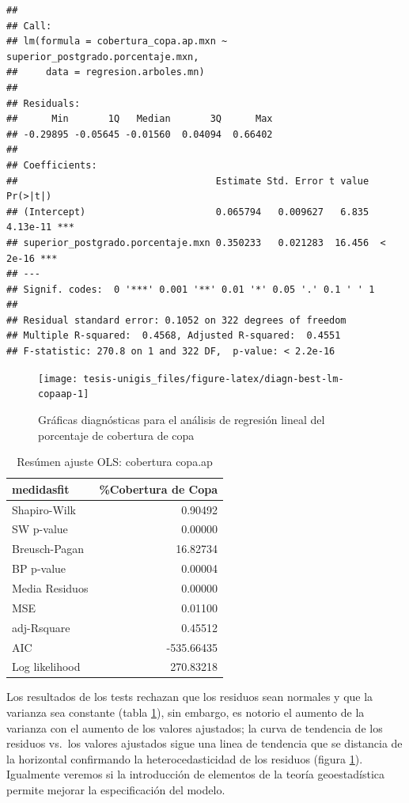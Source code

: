 \documentclass[12pt,]{book}
\begin{document}
\begin{verbatim}
## 
## Call:
## lm(formula = cobertura_copa.ap.mxn ~ superior_postgrado.porcentaje.mxn, 
##     data = regresion.arboles.mn)
## 
## Residuals:
##      Min       1Q   Median       3Q      Max 
## -0.29895 -0.05645 -0.01560  0.04094  0.66402 
## 
## Coefficients:
##                                   Estimate Std. Error t value Pr(>|t|)    
## (Intercept)                       0.065794   0.009627   6.835 4.13e-11 ***
## superior_postgrado.porcentaje.mxn 0.350233   0.021283  16.456  < 2e-16 ***
## ---
## Signif. codes:  0 '***' 0.001 '**' 0.01 '*' 0.05 '.' 0.1 ' ' 1
## 
## Residual standard error: 0.1052 on 322 degrees of freedom
## Multiple R-squared:  0.4568, Adjusted R-squared:  0.4551 
## F-statistic: 270.8 on 1 and 322 DF,  p-value: < 2.2e-16
\end{verbatim}

\begin{figure}
\texttt{[image: tesis-unigis\_files/figure-latex/diagn-best-lm-copaap-1]} \caption{Gráficas diagnósticas para el análisis de regresión lineal del porcentaje de cobertura de copa}\label{fig:diagn-best-lm-copaap}
\end{figure}

\begin{table}

\caption{\label{tab:fitlm-copaap-best}Resúmen ajuste OLS: cobertura copa.ap}
\centering
\begin{tabular}[t]{l|r}
\hline
medidasfit & \%Cobertura de Copa\\
\hline
Shapiro-Wilk & 0.90492\\
\hline
SW p-value & 0.00000\\
\hline
Breusch-Pagan & 16.82734\\
\hline
BP p-value & 0.00004\\
\hline
Media Residuos & 0.00000\\
\hline
MSE & 0.01100\\
\hline
adj-Rsquare & 0.45512\\
\hline
AIC & -535.66435\\
\hline
Log likelihood & 270.83218\\
\hline
\end{tabular}
\end{table}

Los resultados de los tests rechazan que los residuos sean normales y
que la varianza sea constante (tabla \ref{tab:fitlm-copaap-best}), sin
embargo, es notorio el aumento de la varianza con el aumento de los
valores ajustados; la curva de tendencia de los residuos vs.~los valores
ajustados sigue una linea de tendencia que se distancia de la horizontal
confirmando la heterocedasticidad de los residuos (figura
\ref{fig:diagn-best-lm-copaap}). Igualmente veremos si la introducción
de elementos de la teoría geoestadística permite mejorar la
especificación del modelo.
\end{document}
